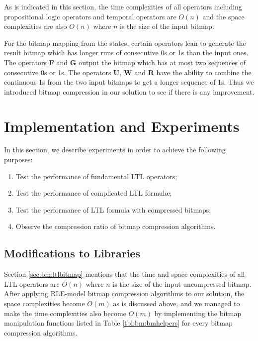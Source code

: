 As is indicated in this section, the time complexities of all operators including propositional logic operators and temporal operators are $O(n)$ and the space complexities are also $O(n)$ where $n$ is the size of the input bitmap.

For the bitmap mapping from the states, certain operators lean to generate the result bitmap which has longer runs of consecutive 0s or 1s than the input ones. The operators \textbf{F} and \textbf{G} output the bitmap which has at most two sequences of consecutive 0s or 1s. The operators \textbf{U}, \textbf{W} and \textbf{R} have the ability to combine the continuous 1s from the two input bitmaps to get a longer sequence of 1s. Thus we introduced bitmap compression in our solution to see if there is any improvement.



\section{Implementation and Experiments}\label{sec:bm:experiments} %

In this section, we describe experiments in order to achieve the following purposes:
\begin{enumerate}
\item Test the performance of fundamental LTL operators;
\item Test the performance of complicated LTL formul\ae{};
\item Test the performance of LTL formula with compressed bitmaps;
\item Observe the compression ratio of bitmap compression algorithms.
\end{enumerate}

\subsection{Modifications to Libraries} %

Section \ref{sec:bm:ltlbitmap} mentions that the time and space complexities of all LTL operators are $O(n)$ where $n$ is the size of the input uncompressed bitmap. After applying RLE-model bitmap compression algorithms to our solution, the space complexities become $O(m)$ as is discussed above, and we managed to make the time complexities also become $O(m)$ by implementing the bitmap manipulation functions listed in Table \ref{tbl:bm:bmhelpers} for every  bitmap compression algorithms.

